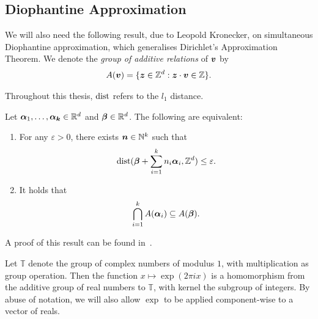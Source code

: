 \subsection{Diophantine Approximation}

We will also need the following result, due to Leopold Kronecker, on simultaneous Diophantine approximation, which generalises Dirichlet's Approximation Theorem. We denote the \emph{group of additive relations} of $\boldsymbol{v}$ by
\begin{align*}
A(\boldsymbol{v}) = \lbrace \boldsymbol{z} \in \mathbb{Z}^{d} : \boldsymbol{z} \cdot \boldsymbol{v} \in \mathbb{Z} \rbrace .
\end{align*}

Throughout this thesis, $\operatorname{dist}$ refers to the $l_{1}$ distance.

\begin{theorem}[Kronecker]
\label{thm:Kronecker}
Let $\boldsymbol{\alpha}_{1}, \ldots, \boldsymbol{\alpha_{k}} \in \mathbb{R}^{d}$ and $\boldsymbol{\beta} \in \mathbb{R}^{d}$. The following are equivalent:
\begin{enumerate}
\item For any $\varepsilon > 0$, there exists $\boldsymbol{n} \in \mathbb{N}^{k}$ such that
\begin{align*}
\operatorname{dist}(\boldsymbol{\beta} + \sum\limits_{i=1}^{k} n_{i} \boldsymbol{\alpha}_{i}, \mathbb{Z}^{d}) \leq \varepsilon .
\end{align*}
\item It holds that
\begin{align*}
\bigcap\limits_{i=1}^{k} A(\boldsymbol{\alpha}_{i}) \subseteq A(\boldsymbol{\beta}) .
\end{align*}
\end{enumerate}
\end{theorem}

A proof of this result can be found in~\cite{Cassels}.

Let $\mathbb{T}$ denote the group of complex numbers of modulus $1$, with multiplication as group operation. Then the function $x \mapsto \exp(2 \pi i x)$ is a homomorphism from the additive group of real numbers to $\mathbb{T}$, with kernel the subgroup of integers. By abuse of notation, we will also allow $\exp$ to be applied component-wise to a vector of reals.

